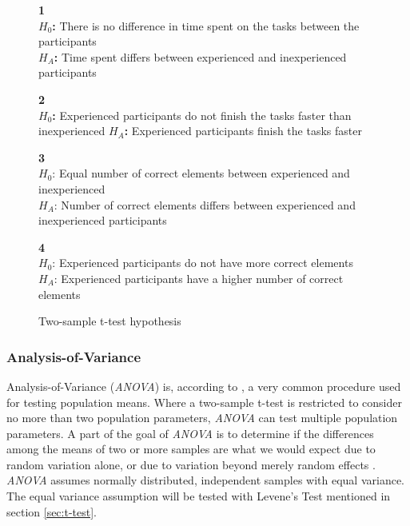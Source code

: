 \begin{figure}[H]
	\begin{framed}\centering
		\textbf{1}\\
		\textbf{$H_{0}$:} There is no difference in time spent on the tasks between the participants\\
		\textbf{$H_{A}$:} Time spent differs between experienced and inexperienced participants \newline
		
		\textbf{2}\\
		\textbf{$H_{0}$:} Experienced participants do not finish the tasks faster than inexperienced\newline
		\textbf{$H_{A}$:} Experienced participants finish the tasks faster\newline
		
		\textbf{3}\\
		$H_{0}$: Equal number of correct elements between experienced and inexperienced \\
		$H_{A}$: Number of correct elements differs between experienced and inexperienced participants\newline
		
		\textbf{4}\\
		$H_{0}$: Experienced participants do not have more correct elements\\
		$H_{A}$: Experienced participants have a higher number of correct elements\newline
	\end{framed}
	\caption{Two-sample t-test hypothesis}
	\label{fig:hypothesis_ttest}
\end{figure}

\subsubsection[ANOVA]{Analysis-of-Variance}\label{sec:anova}
Analysis-of-Variance (\textit{ANOVA}) is, according to \cite{Walpole2012}, a very common procedure used for testing population means. Where a two-sample t-test is restricted to consider no more than two population parameters, \textit{ANOVA} can test multiple population parameters. A part of the goal of \textit{ANOVA} is to determine if the differences among the means of two or more samples are what we would expect due to random variation alone, or due to variation beyond merely random effects \citep{Walpole2012}. \textit{ANOVA} assumes normally distributed, independent samples with equal variance. The equal variance assumption will be tested with Levene's Test mentioned in section \ref{sec:t-test}. 

